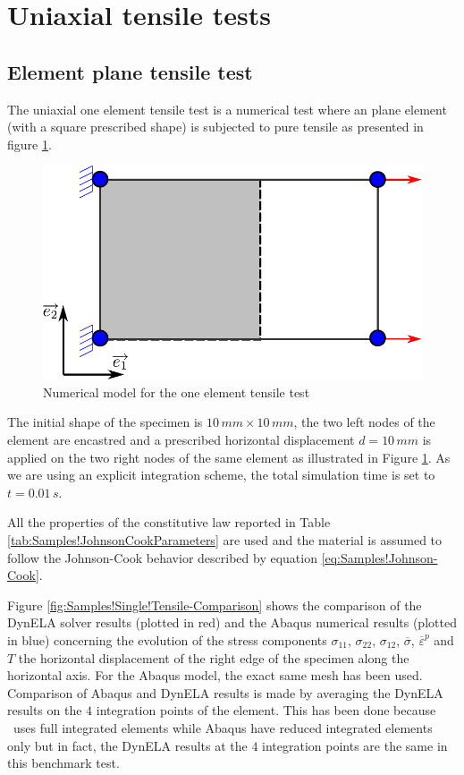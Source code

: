\section{Uniaxial tensile tests}

\subsection{Element plane tensile test}

The uniaxial one element tensile test is a numerical test where an
plane element (with a square prescribed shape) is subjected to pure
tensile as presented in figure \ref{fig:Samples!Single!Tensile}.
\begin{figure}[h]
\begin{centering}
\includegraphics[width=0.5\columnwidth]{Figures/SamplesSingleTensile}
\par\end{centering}
\caption{Numerical model for the one element tensile test\label{fig:Samples!Single!Tensile}}
\end{figure}
 The initial shape of the specimen is $10\,mm\times10\,mm$, the two
left nodes of the element are encastred and a prescribed horizontal
displacement $d=10\,mm$ is applied on the two right nodes of the
same element as illustrated in Figure \ref{fig:Samples!Single!Tensile}.
As we are using an explicit integration scheme, the total simulation
time is set to $t=0.01\,s$. 

All the properties of the constitutive law reported in Table \ref{tab:Samples!JohnsonCookParameters}
are used and the material is assumed to follow the Johnson-Cook behavior
described by equation \ref{eq:Samples!Johnson-Cook}.

Figure \ref{fig:Samples!Single!Tensile-Comparison} shows the comparison
of the DynELA solver results (plotted in red) and the Abaqus numerical
results (plotted in blue) concerning the evolution of the stress components
$\sigma_{11}$, $\sigma_{22}$, $\sigma_{12}$, $\overline{\sigma}$,
$\overline{\varepsilon}^{p}$ and $T$ \versus  the horizontal displacement
of the right edge of the specimen along the horizontal axis. For the
Abaqus model, the exact same mesh has been used. Comparison of Abaqus
and DynELA results is made by averaging the DynELA results on the
$4$ integration points of the element. This has been done because
\Dynela~uses full integrated elements while Abaqus have reduced
integrated elements only but in fact, the DynELA results at the $4$
integration points are the same in this benchmark test.

